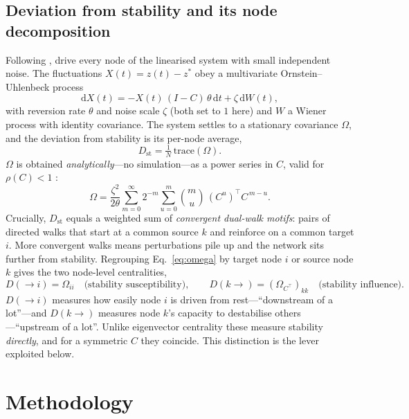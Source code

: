 \documentclass[11pt,a4paper]{article}
\newcommand{\Dst}{D_{\mathrm{st}}}
\newcommand{\Dto}{D(\!\to\! i)}
\newcommand{\Dfrom}{D(k\!\to\!)}
\newcommand{\rhoC}{\rho(C)}
\begin{document}
\subsection{Deviation from stability and its node decomposition}
Following \citet{liao_lizier2026}, drive every node of the linearised system with small independent
noise. The fluctuations $X(t)=z(t)-z^{*}$ obey a multivariate Ornstein--Uhlenbeck process
\begin{equation}
  \mathrm{d}X(t) = -X(t)\,(I-C)\,\theta\,\mathrm{d}t + \zeta\,\mathrm{d}W(t),
  \label{eq:ou}
\end{equation}
with reversion rate $\theta$ and noise scale $\zeta$ (both set to $1$ here) and $W$ a Wiener process
with identity covariance. The system settles to a stationary covariance $\Omega$, and the deviation
from stability is its per-node average,
\begin{equation}
  \Dst = \tfrac{1}{N}\,\mathrm{trace}(\Omega).
  \label{eq:dst}
\end{equation}
$\Omega$ is obtained \emph{analytically}---no simulation---as a power series in $C$, valid for
$\rhoC<1$ \citep{liao_lizier2026,schwarze2021}:
\begin{equation}
  \Omega = \frac{\zeta^2}{2\theta}\sum_{m=0}^{\infty} 2^{-m}\sum_{u=0}^{m}\binom{m}{u}
  \,(C^{u})^{\!\top}C^{\,m-u}.
  \label{eq:omega}
\end{equation}
Crucially, $\Dst$ equals a weighted sum of \emph{convergent dual-walk motifs}: pairs of directed
walks that start at a common source $k$ and reinforce on a common target $i$. More convergent walks
means perturbations pile up and the network sits further from stability. Regrouping
Eq.~\eqref{eq:omega} by target node $i$ or source node $k$ gives the two node-level centralities,
\begin{equation}
  \Dto = \Omega_{ii} \quad\text{(stability susceptibility)}, \qquad
  \Dfrom = (\Omega_{C^{\top}})_{kk} \quad\text{(stability influence)}.
  \label{eq:centralities}
\end{equation}
$\Dto$ measures how easily node $i$ is driven from rest---``downstream of a lot''---and $\Dfrom$
measures node $k$'s capacity to destabilise others---``upstream of a lot''. Unlike eigenvector
centrality these measure stability \emph{directly}, and for a symmetric $C$ they coincide. This
distinction is the lever exploited below.

\section{Methodology}
\end{document}
